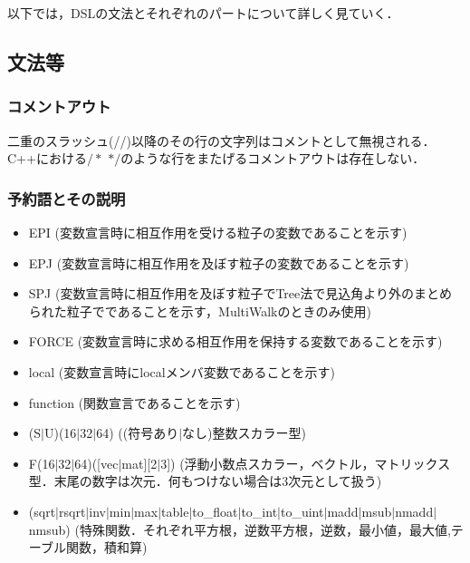 \documentclass{article}
\begin{document}
 以下では，DSLの文法とそれぞれのパートについて詳しく見ていく．

 \subsection{文法等}
 \subsubsection{コメントアウト}
 二重のスラッシュ(//)以降のその行の文字列はコメントとして無視される．C++における$/*$ $*/$のような行をまたげるコメントアウトは存在しない．

 \subsubsection{予約語とその説明}
 \begin{itemize}
  \item EPI (変数宣言時に相互作用を受ける粒子の変数であることを示す)
  \item EPJ (変数宣言時に相互作用を及ぼす粒子の変数であることを示す)
  \item SPJ (変数宣言時に相互作用を及ぼす粒子でTree法で見込角より外のまとめられた粒子でであることを示す，MultiWalkのときのみ使用)
  \item FORCE (変数宣言時に求める相互作用を保持する変数であることを示す)
  \item local (変数宣言時にlocalメンバ変数であることを示す)
  \item function (関数宣言であることを示す)
  \item (S$|$U)(16$|$32$|$64) ((符号あり$|$なし)整数スカラー型)
  \item F(16$|$32$|$64)([vec$|$mat][2$|$3]) (浮動小数点スカラー，ベクトル，マトリックス型．末尾の数字は次元．何もつけない場合は3次元として扱う)
  \item (sqrt$|$rsqrt$|$inv$|$min$|$max$|$table$|$to\_float$|$to\_int$|$to\_uint$|$madd$|$msub$|$nmadd$|$nmsub) (特殊関数．それぞれ平方根，逆数平方根，逆数，最小値，最大値,テーブル関数，積和算)
 \end{itemize}
\end{document}
